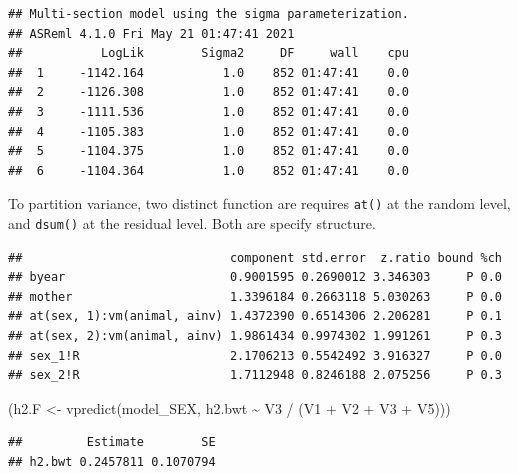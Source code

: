 \documentclass[
  12pt,
]{book}
\newenvironment{Shaded}{\begin{snugshade}}{\end{snugshade}}
\newcommand{\FunctionTok}[1]{\textcolor[rgb]{0.00,0.00,0.00}{#1}}
\newcommand{\NormalTok}[1]{#1}
\newcommand{\OtherTok}[1]{\textcolor[rgb]{0.56,0.35,0.01}{#1}}
\newcommand{\SpecialCharTok}[1]{\textcolor[rgb]{0.00,0.00,0.00}{#1}}
\begin{document}
\begin{verbatim}
## Multi-section model using the sigma parameterization.
## ASReml 4.1.0 Fri May 21 01:47:41 2021
##           LogLik        Sigma2     DF     wall    cpu
##  1     -1142.164           1.0    852 01:47:41    0.0
##  2     -1126.308           1.0    852 01:47:41    0.0
##  3     -1111.536           1.0    852 01:47:41    0.0
##  4     -1105.383           1.0    852 01:47:41    0.0
##  5     -1104.375           1.0    852 01:47:41    0.0
##  6     -1104.364           1.0    852 01:47:41    0.0
\end{verbatim}

To partition variance, two distinct function are requires \texttt{at()} at the random level, and \texttt{dsum()} at the residual level. Both are specify structure.

\begin{Shaded}
\end{Shaded}

\begin{verbatim}
##                             component std.error  z.ratio bound %ch
## byear                       0.9001595 0.2690012 3.346303     P 0.0
## mother                      1.3396184 0.2663118 5.030263     P 0.0
## at(sex, 1):vm(animal, ainv) 1.4372390 0.6514306 2.206281     P 0.1
## at(sex, 2):vm(animal, ainv) 1.9861434 0.9974302 1.991261     P 0.3
## sex_1!R                     2.1706213 0.5542492 3.916327     P 0.0
## sex_2!R                     1.7112948 0.8246188 2.075256     P 0.3
\end{verbatim}

\begin{Shaded}
\begin{Highlighting}[]
\NormalTok{(h2.F }\OtherTok{\textless{}{-}} \FunctionTok{vpredict}\NormalTok{(model\_SEX, h2.bwt }\SpecialCharTok{\textasciitilde{}}\NormalTok{ V3 }\SpecialCharTok{/}\NormalTok{ (V1 }\SpecialCharTok{+}\NormalTok{ V2 }\SpecialCharTok{+}\NormalTok{ V3 }\SpecialCharTok{+}\NormalTok{ V5)))}
\end{Highlighting}
\end{Shaded}

\begin{verbatim}
##         Estimate        SE
## h2.bwt 0.2457811 0.1070794
\end{verbatim}
\end{document}
